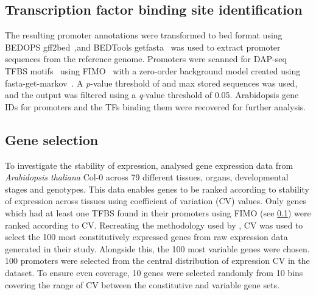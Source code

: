 \subsection{Transcription factor binding site identification}
\label{chapter1:methods:transcription-factor-binding-site-identification}

The resulting promoter annotations were transformed to bed format using BEDOPS gff2bed~\autocite{nephBEDOPSHighperformanceGenomic2012},and BEDTools getfasta~\autocite{quinlanBEDToolsFlexibleSuite2010} was used to extract promoter sequences from the reference genome.
Promoters were scanned for DAP\hyp{}seq TFBS motifs~\autocite{omalleyCistromeEpicistromeFeatures2016} using FIMO~\autocite{grantFIMOScanningOccurrences2011} with a zero\hyp{}order background model created using fasta\hyp{}get\hyp{}markov~\autocite{baileyMEMESuiteTools2009}.
A \textit{p}-value threshold of  and max stored sequences  was used, and the output was filtered using a \textit{q}\hyp{}value threshold of 0.05.
Arabidopsis gene IDs for promoters and the TFs binding them were recovered for further analysis.

\subsection{Gene selection}\label{chapter1:methods:gene-selection}

To investigate the stability of expression, \textcite*{czechowskiGenomeWideIdentificationTesting2005} analysed gene expression data from \textit{Arabidopsis thaliana} Col-0 across 79 different tissues, organs, developmental stages and genotypes.
This data enables genes to be ranked according to stability of expression across tissues using coefficient of variation (CV) values.
Only genes which had at least one TFBS found in their promoters using FIMO (see \ref{chapter1:methods:transcription-factor-binding-site-identification}) were ranked according to CV.
Recreating the methodology used by \textcite*{czechowskiGenomeWideIdentificationTesting2005}, CV was used to select the 100 most constitutively expressed genes from raw expression data generated in their study.
Alongside this, the 100 most variable genes were chosen.
100 promoters were selected from the central distribution of expression CV in the \textcite*{czechowskiGenomeWideIdentificationTesting2005} dataset.
To ensure even coverage, 10 genes were selected randomly from 10 bins covering the range of CV between the constitutive and variable gene sets.


